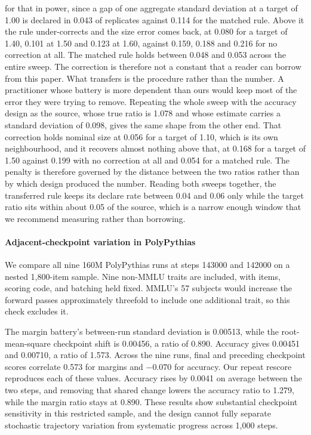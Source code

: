 for that in power, since a gap of one aggregate standard deviation at a target of 1.00 is declared in 0.043 of replicates against 0.114 for the matched rule. Above it the rule under-corrects and the size error comes back, at 0.080 for a target of 1.40, 0.101 at 1.50 and 0.123 at 1.60, against 0.159, 0.188 and 0.216 for no correction at all. The matched rule holds between 0.048 and 0.053 across the entire sweep. The correction is therefore not a constant that a reader can borrow from this paper. What transfers is the procedure rather than the number. A practitioner whose battery is more dependent than ours would keep most of the error they were trying to remove. Repeating the whole sweep with the accuracy design as the source, whose true ratio is 1.078 and whose estimate carries a standard deviation of 0.098, gives the same shape from the other end. That correction holds nominal size at 0.056 for a target of 1.10, which is its own neighbourhood, and it recovers almost nothing above that, at 0.168 for a target of 1.50 against 0.199 with no correction at all and 0.054 for a matched rule. The penalty is therefore governed by the distance between the two ratios rather than by which design produced the number. Reading both sweeps together, the transferred rule keeps its declare rate between 0.04 and 0.06 only while the target ratio sits within about 0.05 of the source, which is a narrow enough window that we recommend measuring rather than borrowing.

\paragraph{Adjacent-checkpoint variation in PolyPythias}
We compare all nine 160M PolyPythias runs at steps 143000 and 142000 on a nested 1,800-item sample. Nine non-MMLU traits are included, with items, scoring code, and batching held fixed. MMLU's 57 subjects would increase the forward passes approximately threefold to include one additional trait, so this check excludes it.

The margin battery's between-run standard deviation is 0.00513, while the root-mean-square checkpoint shift is 0.00456, a ratio of 0.890. Accuracy gives 0.00451 and 0.00710, a ratio of 1.573. Across the nine runs, final and preceding checkpoint scores correlate 0.573 for margins and $-0.070$ for accuracy. Our repeat rescore reproduces each of these values. Accuracy rises by 0.0041 on average between the two steps, and removing that shared change lowers the accuracy ratio to 1.279, while the margin ratio stays at 0.890. These results show substantial checkpoint sensitivity in this restricted sample, and the design cannot fully separate stochastic trajectory variation from systematic progress across 1,000 steps.

